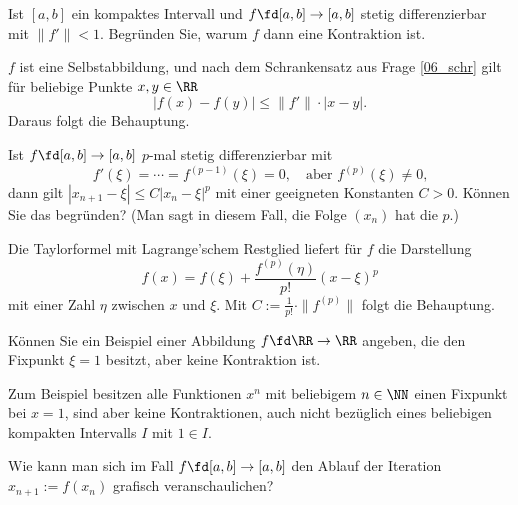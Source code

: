 \begin{frage}
  Ist $[a,b]$ ein kompaktes Intervall und $f\fd [a,b]\to[a,b]$ 
  stetig differenzierbar mit $\| f' \| < 1$. Begründen Sie, 
  warum $f$ dann eine Kontraktion ist.
\end{frage}

\begin{antwort}
  $f$ ist eine Selbstabbildung, und nach  
  dem Schrankensatz aus Frage \ref{06_schr} gilt für beliebige 
  Punkte $x,y \in\RR$ 
  \[
  | f(x)-f(y) | \le \| f' \| \cdot |x-y|.
  \]
  Daraus folgt die Behauptung. \AntEnd
\end{antwort}

\begin{frage} 
  Ist $f \fd [a,b] \to [a,b]$ $p$-mal stetig differenzierbar mit 
  \[
  f'(\xi)=\cdots = f^{(p-1)}(\xi)=0,  
  \quad\text{aber $f^{(p)} ( \xi ) \not=0$,}
  \] 
  dann gilt $|x_{n+1}-\xi| \le C| x_n - \xi | ^p$ mit einer 
  geeigneten Konstanten $C>0$. Können Sie das begründen? 
  (Man sagt in diesem Fall, die Folge $(x_n)$ hat die 
   $p$.)
\end{frage}

\begin{antwort}
  Die Taylorformel mit Lagrange'schem Restglied liefert 
  für $f$ die Darstellung 
  \[
  f(x) = f(\xi)+\frac{f^{(p)}(\eta)}{ p! } (x-\xi)^p 
  \]
  mit einer Zahl $\eta$ zwischen $x$ und $\xi$. 
  Mit $C:=\frac{1}{p!}\cdot \| f^{(p)} \|$ 
  folgt die Behauptung.
  \AntEnd 
\end{antwort}

\begin{frage}
  Können Sie ein Beispiel einer Abbildung $f\fd \RR\to \RR$ 
  angeben, die den Fixpunkt $\xi=1$ besitzt, aber keine 
  Kontraktion ist. 
\end{frage}

\begin{antwort}
  Zum Beispiel besitzen alle Funktionen $x^n$ mit 
  beliebigem $n\in \NN$ einen Fixpunkt bei $x=1$, sind 
  aber keine Kontraktionen, auch nicht bezüglich 
  eines beliebigen kompakten Intervalls $I$ mit 
  $1\in I$.
  \AntEnd  
\end{antwort}

\begin{frage}
  Wie kann man sich im Fall $f\fd [a,b] \to [a,b]$ den Ablauf der 
  Iteration $x_{n+1}:=f(x_n)$ grafisch veranschaulichen?
\end{frage}

